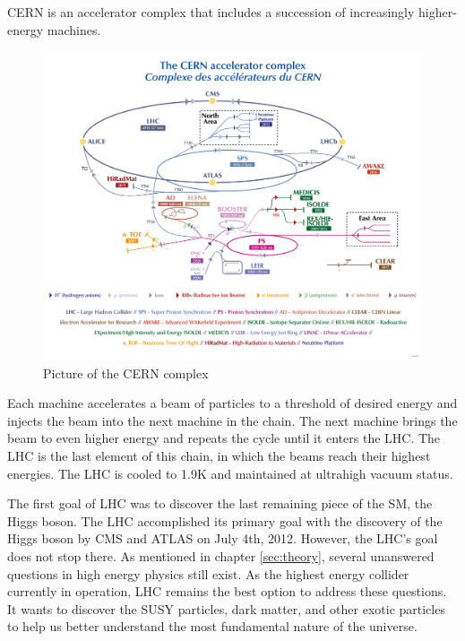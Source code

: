 CERN is an accelerator complex that includes a succession of increasingly higher-energy machines.
\begin{figure}[h!]
  \label{fig:CERN}
  \centering
  \includegraphics[width=1.0\linewidth]{figs/LHC.png}
	\caption{Picture of the CERN complex \cite{CERN}}
\end{figure}
Each machine accelerates a beam of particles to a threshold of desired energy and injects the beam into the next machine in the chain.
The next machine brings the beam to even higher energy and repeats the cycle until it enters the LHC.
The LHC is the last element of this chain, in which the beams reach their highest energies.
The LHC is cooled to 1.9K and maintained at ultrahigh vacuum status.

The first goal of LHC was to discover the last remaining piece of the SM, the Higgs boson.
The LHC accomplished its primary goal with the discovery of the Higgs boson by CMS and ATLAS on July 4th, 2012.
However, the LHC's goal does not stop there.
As mentioned in chapter \ref{sec:theory}, several unanswered questions in high energy physics still exist.
As the highest energy collider currently in operation, LHC remains the best option to address these questions. 
It wants to discover the SUSY particles, dark matter, and other exotic particles to help us better understand the most fundamental nature of the universe.

